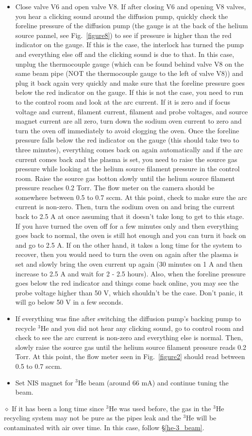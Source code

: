 \documentclass{article}
\begin{document}
\begin{itemize}
  \item Close valve V6 and open valve V8. If after closing V6 and opening V8 valves, you hear a clicking sound around the diffusion pump, quickly check the foreline pressure of the diffusion pump (the gauge is at the back of the helium source pannel, see Fig.~\ref{figure8}) to see if pressure is higher than the red indicator on the gauge. If this is the case, the interlock has turned the pump and everything else off and the clicking sound is due to that. In this case, unplug the thermocouple gauge (which can be found behind valve V8 on the same beam pipe (NOT the thermocouple gauge to the left of valve V8)) and plug it back again very quickly and make sure that the foreline pressure goes below the red indicator on the gauge. If this is not the case, you need to run to the control room and look at the arc current. If it is zero and if focus voltage and current, filament current, filament and probe voltages, and source magnet current are all zero, turn down the sodium oven current to zero and turn the oven off immediately to avoid clogging the oven. Once the foreline pressure falls below the red indicator on the gauge (this should take two to three minutes), everything comes back on again automatically and if the arc current comes back and the plasma is set, you need to raise the source gas pressure while looking at the helium source filament pressure in the control room. Raise the source gas botton slowly until the helium source filament pressure reaches 0.2 Torr. The flow meter on the camera should be somewhere between 0.5 to 0.7 sccm. At this point, check to make sure the arc current is non-zero. Then, turn the sodium oven on and bring the current back to 2.5 A at once assuming that it doesn't take long to get to this stage. If you have turned the oven off for a few minutes only and then everything goes back to normal, the oven is still hot enough and you can turn it back on and go to 2.5 A. If on the other hand, it takes a long time for the system to recover, then you would need to turn the oven on again after the plasma is set and slowly bring the oven current up again (30 minutes on 1 A and then increase to 2.5 A and wait for 2 - 2.5 hours). Also, when the foreline pressure goes below the red indicator and things come back online, you may see the probe voltage higher than 50 V, which shouldn't be the case. Don't panic, it will go below 50 V in a few seconds.
  \item If everything was fine after switching the diffusion pump's backing pump to recycle $^{3}$He and you did not hear any clicking sound, go to control room and check to see the arc current is non-zero and everything else is normal. Then, slowly raise the source gas until the helium source filament pressure reads 0.2 Torr. At this point, the flow meter seen in Fig.~\ref{figure2} should read between 0.5 to 0.7 sccm.
  \item Set NIS magnet for $^{3}$He beam (around 66 mA) and continue tuning the beam.
\end{itemize}
$\diamond$ If it has been a long time since $^{3}$He was used before, the gas in the $^{3}$He recycling system may not be pure as the pipes leak and the $^{3}$He will be contaminated with air over time. In this case, follow \S\ref{he-3_beam}.
\end{document}
